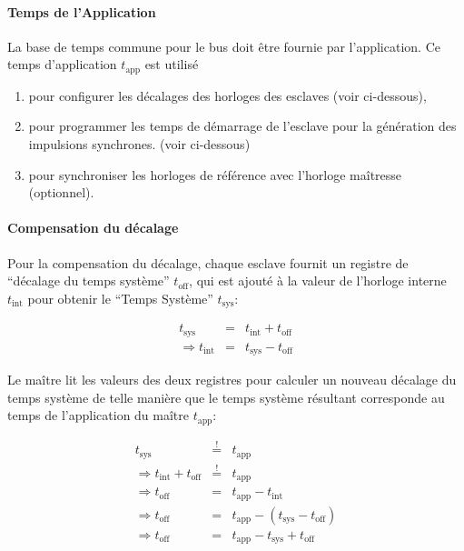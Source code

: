 \documentclass[a4paper,12pt,BCOR6mm,bibtotoc,idxtotoc]{scrbook}
\begin{document}
\paragraph{Temps de l'Application} La base de temps commune pour le bus
doit \^etre fournie par l'application.
Ce temps d'application $t_\text{app}$ est utilis\'e

\begin{enumerate}
\item pour configurer les d\'ecalages des horloges des esclaves (voir ci-dessous),
\item pour programmer les temps de d\'emarrage de l'esclave pour
  la g\'en\'eration des impulsions synchrones. (voir ci-dessous)
\item pour synchroniser les horloges de r\'ef\'erence avec l'horloge
  ma\^itresse (optionnel).
\end{enumerate}

\paragraph{Compensation du d\'ecalage} Pour la compensation du d\'ecalage,
chaque esclave fournit un registre de ``d\'ecalage du temps
syst\`eme'' $t_\text{off}$, qui est ajout\'e \`a la valeur de
l'horloge interne $t_\text{int}$ pour obtenir le ``Temps Syst\`eme''
$t_\text{sys}$:

\begin{eqnarray}
t_\text{sys} & = & t_\text{int} + t_\text{off} \\
\Rightarrow t_\text{int} & = & t_\text{sys} - t_\text{off} \nonumber
\end{eqnarray}

Le ma\^itre lit les valeurs des deux registres pour calculer un nouveau
d\'ecalage du temps syst\`eme de telle mani\`ere que
le temps syst\`eme r\'esultant corresponde au temps de l'application du
ma\^itre $t_\text{app}$:

\begin{eqnarray}
t_\text{sys} & \stackrel{!}{=} & t_\text{app} \\
\Rightarrow t_\text{int} + t_\text{off} & \stackrel{!}{=} & t_\text{app} \nonumber \\
\Rightarrow t_\text{off} & = & t_\text{app} - t_\text{int} \nonumber \\
\Rightarrow t_\text{off} & = & t_\text{app} - (t_\text{sys} - t_\text{off}) \nonumber \\
\Rightarrow t_\text{off} & = & t_\text{app} - t_\text{sys} + t_\text{off}
\end{eqnarray}
\end{document}

